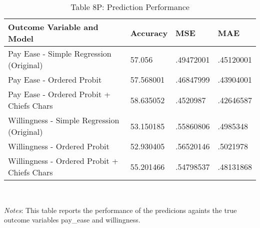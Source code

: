 \begin{table}[H]
	\centering
	\centerfloat
	\begin{center}
		\caption*{Table 8P: Prediction Performance }
		\begin{tabular}{|l|l|l|l|}\hline  
				\textbf{Outcome Variable and Model } & \textbf{Accuracy}  & \textbf{MSE}  & \textbf{MAE }\\ \hline  
				Pay Ease - Simple Regression (Original)& 57.056 & .49472001 & .45120001 \\ \hline 
				Pay Ease - Ordered Probit  & 57.568001 & .46847999 & .43904001 \\ \hline 
				Pay Ease - Ordered Probit + Chiefs Chars & 58.635052 & .4520987 & .42646587 \\ \hline 
				Willingness - Simple Regression (Original)  & 53.150185 & .55860806 & .4985348 \\ \hline 
				Willingness - Ordered Probit & 52.930405 & .56520146 & .5021978 \\ \hline 
				Willingness - Ordered Probit + Chiefs Chars  & 55.201466 & .54798537 & .48131868 \\ \hline 
		  \end{tabular}
	  \usebox{\tablebox}\\[1ex]
	  \parbox{6in}{\footnotesize \textit{Notes}: This table reports the performance of the predicions againts the true outcome variables pay\_ease and willingness.}
  \end{center}
\end{table}
